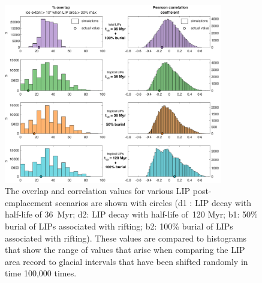 \documentclass[11pt,letterpaper]{article}
\begin{document}
\begin{figure}[h!]
\begin{center}
	\includegraphics[width=0.85\textwidth]{Manuscript/Figures/overlap_correlation_cropped.pdf}
	\caption{The overlap and correlation values for various LIP post-emplacement scenarios are shown with circles (d1 : LIP decay with half-life of 36~Myr; d2: LIP decay with half-life of~120 Myr; b1: 50\% burial of LIPs associated with rifting; b2: 100\% burial of LIPs associated with rifting). These values are compared to histograms that show the range of values that arise when comparing the LIP area record to glacial intervals that have been shifted randomly in time 100,000 times.}
	\label{fig:LIP_correlation}
\end{center}
\end{figure}

\clearpage
\newpage
\footnotesize

\singlespacing



\end{document}
